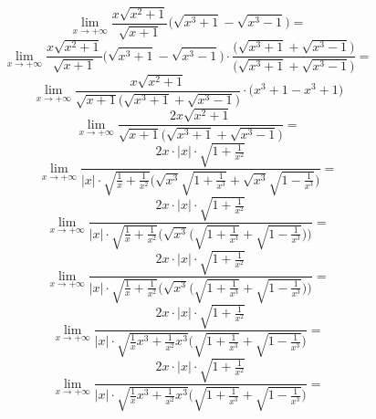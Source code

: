 \documentclass{article}
\begin{document}
\begin{equation*}
    \lim_{x \to +\infty} \frac{x \sqrt{x^{2} + 1}}{\sqrt{x + 1}}\Big(\sqrt{x^{3} + 1} - \sqrt{x^{3} - 1}\Big) = 
\end{equation*}
\begin{equation*}
    \lim_{x \to +\infty} \frac{x \sqrt{x^{2} + 1}}{\sqrt{x + 1}}\Big(\sqrt{x^{3} + 1} - \sqrt{x^{3} - 1}\Big) \cdot \frac{\Big(\sqrt{x^{3} + 1} + \sqrt{x^{3} - 1}\Big)}{\Big(\sqrt{x^{3} + 1} + \sqrt{x^{3} - 1}\Big)} =
\end{equation*}
\begin{equation*}
    \lim_{x \to +\infty} \frac{x \sqrt{x^{2} + 1}}{\sqrt{x + 1}\Big(\sqrt{x^{3} + 1} + \sqrt{x^{3} - 1}\Big)} \cdot \Big( x^{3} + 1 - x^{3} + 1 \Big)
\end{equation*}
\begin{equation*}
    \lim_{x \to +\infty} \frac{2x \sqrt{x^{2} + 1}}{\sqrt{x + 1}\Big(\sqrt{x^{3} + 1} + \sqrt{x^{3} - 1}\Big)} = 
\end{equation*}
\begin{equation*}
    \lim_{x \to +\infty} \frac{2x \cdot |x| \cdot \sqrt{1 + \frac{1}{x^{2}}}} {|x| \cdot \sqrt{\frac{1}{x} + \frac{1}{x^2}}\Big(\sqrt{x^3} \sqrt{1 + \frac{1}{x^3}} + \sqrt{x^3} \sqrt{1 - \frac{1}{x^3}}\Big)} = 
\end{equation*}
\begin{equation*}
    \lim_{x \to +\infty} \frac{2x \cdot |x| \cdot \sqrt{1 + \frac{1}{x^{2}}}} {|x| \cdot \sqrt{\frac{1}{x} + \frac{1}{x^2}}\Bigg(\sqrt{x^3} \Big( \sqrt{1 + \frac{1}{x^3}} + \sqrt{1 - \frac{1}{x^3}} \Big) \Bigg)} = 
\end{equation*}
\begin{equation*}
    \lim_{x \to +\infty} \frac{2x \cdot |x| \cdot \sqrt{1 + \frac{1}{x^{2}}}} {|x| \cdot \sqrt{\frac{1}{x} + \frac{1}{x^2}}\Bigg(\sqrt{x^3} \Big( \sqrt{1 + \frac{1}{x^3}} + \sqrt{1 - \frac{1}{x^3}} \Big) \Bigg)} = 
\end{equation*}
\begin{equation*}
    \lim_{x \to +\infty} \frac{2x \cdot |x| \cdot \sqrt{1 + \frac{1}{x^{2}}}} {|x| \cdot \sqrt{\frac{1}{x}x^3 + \frac{1}{x^2}x^3}\Bigg(\sqrt{1 + \frac{1}{x^3}} + \sqrt{1 - \frac{1}{x^3}}\Bigg)} = 
\end{equation*}
\begin{equation*}
    \lim_{x \to +\infty} \frac{2x \cdot |x| \cdot \sqrt{1 + \frac{1}{x^{2}}}} {|x| \cdot \sqrt{\frac{1}{x}x^3 + \frac{1}{x^2}x^3}\Bigg(\sqrt{1 + \frac{1}{x^3}} + \sqrt{1 - \frac{1}{x^3}}\Bigg)} = 
\end{equation*}
\end{document}
